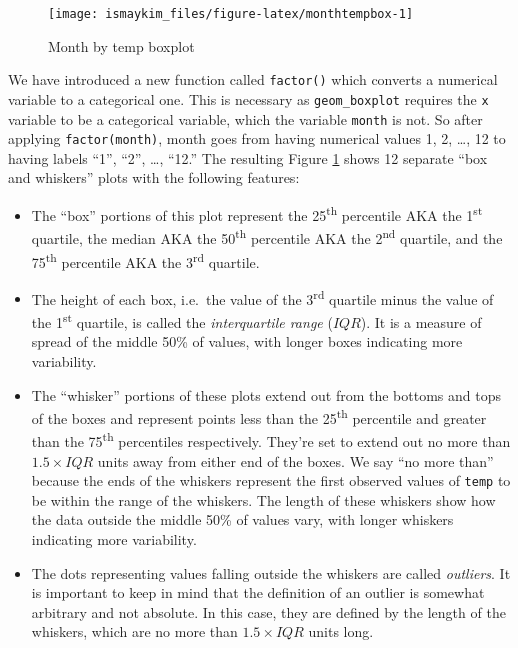 \documentclass[12pt,]{krantz}
\providecommand{\tightlist}{%
  \setlength{\itemsep}{0pt}\setlength{\parskip}{0pt}}
\theoremstyle{definition}
\theoremstyle{definition}
\theoremstyle{definition}
\theoremstyle{remark}
\begin{document}
\begin{figure}

{\centering \texttt{[image: ismaykim\_files/figure-latex/monthtempbox-1]} 

}

\caption{Month by temp boxplot}\label{fig:monthtempbox}
\end{figure}

We have introduced a new function called \texttt{factor()} which
converts a numerical variable to a categorical one. This is necessary as
\texttt{geom\_boxplot} requires the \texttt{x} variable to be a
categorical variable, which the variable \texttt{month} is not. So after
applying \texttt{factor(month)}, month goes from having numerical values
1, 2, \ldots{}, 12 to having labels ``1'', ``2'', \ldots{}, ``12.'' The
resulting Figure \ref{fig:monthtempbox} shows 12 separate ``box and
whiskers'' plots with the following features:

\begin{itemize}
\tightlist
\item
  The ``box'' portions of this plot represent the 25\textsuperscript{th}
  percentile AKA the 1\textsuperscript{st} quartile, the median AKA the
  50\textsuperscript{th} percentile AKA the 2\textsuperscript{nd}
  quartile, and the 75\textsuperscript{th} percentile AKA the
  3\textsuperscript{rd} quartile.
\item
  The height of each box, i.e.~the value of the 3\textsuperscript{rd}
  quartile minus the value of the 1\textsuperscript{st} quartile, is
  called the \emph{interquartile range} (\(IQR\)). It is a measure of
  spread of the middle 50\% of values, with longer boxes indicating more
  variability.
\item
  The ``whisker'' portions of these plots extend out from the bottoms
  and tops of the boxes and represent points less than the
  25\textsuperscript{th} percentile and greater than the
  75\textsuperscript{th} percentiles respectively. They're set to extend
  out no more than \(1.5 \times IQR\) units away from either end of the
  boxes. We say ``no more than'' because the ends of the whiskers
  represent the first observed values of \texttt{temp} to be within the
  range of the whiskers. The length of these whiskers show how the data
  outside the middle 50\% of values vary, with longer whiskers
  indicating more variability.
\item
  The dots representing values falling outside the whiskers are called
  \emph{outliers}. It is important to keep in mind that the definition
  of an outlier is somewhat arbitrary and not absolute. In this case,
  they are defined by the length of the whiskers, which are no more than
  \(1.5 \times IQR\) units long.
\end{itemize}
\end{document}

